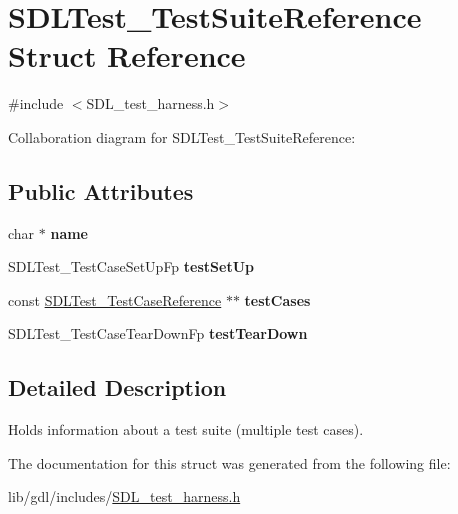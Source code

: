 \hypertarget{struct_s_d_l_test___test_suite_reference}{}\section{S\+D\+L\+Test\+\_\+\+Test\+Suite\+Reference Struct Reference}
\label{struct_s_d_l_test___test_suite_reference}


{\ttfamily \#include $<$S\+D\+L\+\_\+test\+\_\+harness.\+h$>$}



Collaboration diagram for S\+D\+L\+Test\+\_\+\+Test\+Suite\+Reference\+:
\subsection*{Public Attributes}
\begin{DoxyCompactItemize}
\item 
\hypertarget{struct_s_d_l_test___test_suite_reference_a8b002d932f91b321b384e59ae17f8f39}{}char $\ast$ {\bfseries name}\label{struct_s_d_l_test___test_suite_reference_a8b002d932f91b321b384e59ae17f8f39}

\item 
\hypertarget{struct_s_d_l_test___test_suite_reference_a8aa788b982efb93c93c2ab01202e0007}{}S\+D\+L\+Test\+\_\+\+Test\+Case\+Set\+Up\+Fp {\bfseries test\+Set\+Up}\label{struct_s_d_l_test___test_suite_reference_a8aa788b982efb93c93c2ab01202e0007}

\item 
\hypertarget{struct_s_d_l_test___test_suite_reference_a06d97ce5bcf9ceb1300cc4aa39c028d3}{}const \hyperlink{struct_s_d_l_test___test_case_reference}{S\+D\+L\+Test\+\_\+\+Test\+Case\+Reference} $\ast$$\ast$ {\bfseries test\+Cases}\label{struct_s_d_l_test___test_suite_reference_a06d97ce5bcf9ceb1300cc4aa39c028d3}

\item 
\hypertarget{struct_s_d_l_test___test_suite_reference_ad66abaf20653fd7361d28c69f88ac702}{}S\+D\+L\+Test\+\_\+\+Test\+Case\+Tear\+Down\+Fp {\bfseries test\+Tear\+Down}\label{struct_s_d_l_test___test_suite_reference_ad66abaf20653fd7361d28c69f88ac702}

\end{DoxyCompactItemize}


\subsection{Detailed Description}
Holds information about a test suite (multiple test cases). 

The documentation for this struct was generated from the following file\+:\begin{DoxyCompactItemize}
\item 
lib/gdl/includes/\hyperlink{_s_d_l__test__harness_8h}{S\+D\+L\+\_\+test\+\_\+harness.\+h}\end{DoxyCompactItemize}
